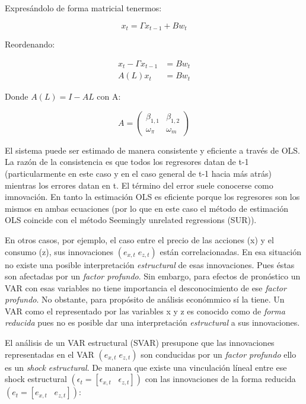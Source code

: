 \documentclass[
]{book}
\begin{document}
Expresándolo de forma matricial tenermos:

\begin{equation}
\label{e1}
x_t = \Gamma x_{t−1} + Bw_t
\end{equation}

Reordenando:

\begin{align}
x_{t}-\Gamma x_{t−1} &=  Bw_t\\
A(L)x_{t}&=  Bw_t
\end{align}

Donde \(A(L)=I-AL\) con A:

\begin{equation}
A=\left( \begin{array}{cc}
 \beta_{1,1} & \beta_{1,2}\\
 \omega_{\pi} & \omega_{m}
    \end{array}
    \right)
\end{equation}

El sistema puede ser estimado de manera consistente y eficiente a través de OLS. La razón de la consistencia es que todos los regresores datan de t-1 (particularmente en este caso y en el caso general de t-1 hacia más atrás) mientras los errores datan en t. El término del error suele conocerse como imnovación. En tanto la estimación OLS es eficiente porque los regresores son los mismos en ambas ecuaciones (por lo que en este caso el método de estimación OLS coincide con el método Seemingly unrelated regressions (SUR)).

En otros casos, por ejemplo, el caso entre el precio de las acciones (x) y el consumo (z), sus innovaciones \((e_{x,t}\;e_{z,t})\) están correlacionadas. En esa situación no existe una posible interpretación \emph{estructural} de esas innovaciones. Pues éstas son afectadas por un \emph{factor profundo}. Sin embargo, para efectos de pronóstico un VAR con esas variables no tiene importancia el desconocimiento de ese \emph{factor profundo}. No obstante, para propósito de análisis económmico sí la tiene. Un VAR como el representado por las variables x y z es conocido como de \emph{forma reducida} pues no es posible dar una interpretación \emph{estructural} a sus innovaciones.

El análisis de un VAR estructural (SVAR) presupone que las innovaciones representadas en el VAR \((e_{x,t}\;e_{z,t})\) son conducidas por un \emph{factor profundo} ello es un \emph{shock estructural}. De manera que existe una vinculación líneal entre ese shock estructural \((\epsilon_{t}=[\epsilon_{x,t}\;\;\;\epsilon_{z,t}])\) con las innovaciones de la forma reducida \((e_{t}=[e_{x,t}\;\;\;e_{z,t}])\):
\end{document}
